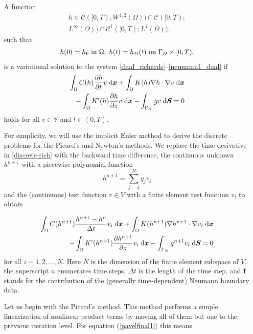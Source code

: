 \documentclass[final,3p,times,twocolumn]{elsarticle}
\newcommand{\bfx}{\mbox{\boldmath $x$}}
\newcommand{\bfS}{\mbox{\boldmath $S$}}
\begin{document}
A function
\begin{equation*}
\begin{split}
h \in \mathcal{C}([0,T);W^{1,2}(\Omega))\cap
\mathcal{C}([0,T); \\ L^{\infty}(\Omega))\cap
\mathcal{C}^1([0,T);L^{2}(\Omega)),
\end{split}
\end{equation*}
such that
$$
h(0)=h_0 \textmd{ in } \Omega, \; h(t)=h_D(t) \textmd{ on } \Gamma_D
\times [0,T),
$$
is a variational solution to the system
\eqref{dual_richards}--\eqref{neumann1_dual} if
\begin{equation}
\begin{split}
\int_{\Omega}  C(h)\frac{\partial h}{\partial t}v \;{\rm
d}\bfx + \int_{\Omega} K(h)\nabla h \cdot \nabla v \;{\rm
d}\bfx \\ - \int_{\Omega}K'(h)\frac{\partial h}{\partial z}v \;{\rm
d}\bfx - \int_{\Gamma_N} g v \;{\rm d}\bfS = 0
\end{split}
\label{discrete-rich}
\end{equation}
holds for all $v \in \mathbb{V}$ and $t\in(0,T)$.

For simplicity, we will use the implicit Euler method 
to derive the discrete problems for the Picard's and 
Newton's methods. We replace the time-derivative
in \eqref{discrete-rich} with the backward time difference, 
the continuous unknown $h^{n+1}$ with a piecewise-polynomial function
$$
h^{n+1} = \sum_{j=1}^N y_j v_j
$$
and the (continuous) test function $v \in V$ with a finite 
element test function $v_i$ to obtain 

\begin{equation}
\begin{split}
\int_{\Omega}  C(h^{n+1})\frac{h^{n+1} - h^n}{\Delta t}v_i \;{\rm
d}\bfx + \int_{\Omega} K(h^{n+1})\nabla h^{n+1} \cdot \nabla v_i \;{\rm
d}\bfx \\ - \int_{\Omega}K'(h^{n+1})\frac{\partial h^{n+1}}{\partial z}v_i \;{\rm
d}\bfx - \int_{\Gamma_N} g^{n+1} v_i \;{\rm d}\bfS = 0
\end{split}
\label{pavelfinal1}
\end{equation}
for all $i = 1, 2, \ldots, N$.
Here $N$ is the dimension of the finite element subspace of $V$,
the superscript $n$ enumerates time steps, $\Delta t$ is the length of the time step, 
and $\mathbf{f}$ stands for the contribution of the (generally time-dependent) 
Neumann boundary data. 

Let us begin with the Picard's method. This method performs a simple linearization of 
nonlinear product terms by moving all of them but one to the previous iteration level.
For equation (\ref{pavelfinal1}) this means
\end{document}
